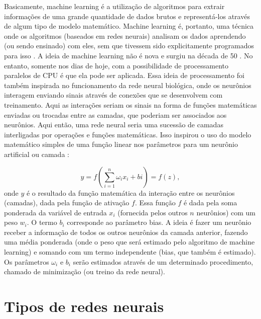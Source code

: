 \documentclass[a4paper,12pt,oneside]{book}
\begin{document}
\par Basicamente, machine learning é a utilização de algoritmos para extrair informações de uma grande quantidade de dados brutos e representá-los através de algum tipo de modelo matemático. Machine learning é, portanto, uma técnica onde os algoritmos (baseados em redes neurais) analisam os dados aprendendo (ou sendo ensinado) com eles, sem que tivessem sido explicitamente programados para isso \cite{mlbook}. A ideia de machine learning não é nova e surgiu na década de 50 \cite{curso, mlbook}. No entanto, somente nos dias de hoje, com a possibilidade de processamento paralelos de CPU é que ela pode ser aplicada. Essa ideia de processamento foi também inspirada no funcionamento da rede neural biológica, onde os neurônios interagem enviando sinais através de conexões que se desenvolvem com treinamento. Aqui as interações seriam os sinais na forma de funções matemáticas enviadas ou trocadas entre as camadas, que poderiam ser associados aos neurônios. Aqui então, uma rede neural seria uma sucessão de camadas interligadas por operações e funções matemáticas. Isso inspirou o uso do modelo matemático simples de uma função linear nos parâmetros para um neurônio artificial ou camada \cite{curso}:

\begin{equation}\label{eq:model_n}
    y = f\left(\sum^{n}_{i = 1}\omega_i x_i + bi\right) = f(z),
\end{equation}
%
onde $y$ é o resultado da função matemática da interação entre os neurônios (camadas), dada pela função de ativação $f$. Essa função $f$ é dada pela soma ponderada da variável de entrada $x_i$ (fornecida pelos outros $n$ neurônios) com um peso $w_i$. O termo $b_i$ corresponde ao parâmetro bias. A ideia é fazer um neurônio receber a informação de todos os outros neurônios da camada anterior, fazendo uma média ponderada (onde o peso que será estimado pelo algoritmo de machine learning) e somando com um termo independente (bias, que também é estimado). Os parâmetros $\omega_i$ e $b_i$ serão estimados através de um determinado procedimento, chamado de minimização (ou treino da rede neural).

\section{Tipos de redes neurais}
\end{document}
